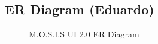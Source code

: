 \subsection{ER Diagram (Eduardo)}
\begin{center}
  \centering
\begin{figure}[ht!]
  \caption{M.O.S.I.S UI 2.0 ER Diagram}
\end{figure}
\end{center}